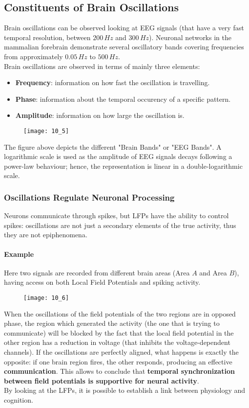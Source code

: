 \subsection{Constituents of Brain Oscillations}
Brain oscillations can be observed looking at EEG signals (that have a very fast temporal
resolution, between \(200\,Hz\) and \(300\,Hz\)). Neuronal networks in the mammalian
forebrain demonstrate several oscillatory bands covering frequencies from approximately
\(0.05\,Hz\) to \(500\,Hz\).\\
Brain oscillations are observed in terms of mainly three elements:
\begin{itemize}
    \item \textbf{Frequency}: information on how fast the oscillation is travelling.
    \item \textbf{Phase}: information about the temporal occurency of a specific pattern.
    \item \textbf{Amplitude}: information on how large the oscillation is.
\end{itemize}
\begin{figure}[H]
    \texttt{[image: 10\_5]}
    \centering
\end{figure}
The figure above depicts the different "Brain Bands" or "EEG Bands". A logarithmic scale is
used as the amplitude of EEG signals decays following a power-law behaviour; hence, the
representation is linear in a double-logarithmic scale.
\subsubsection{Oscillations Regulate Neuronal Processing}
Neurons communicate through spikes, but LFPs have the ability to control spikes: oscillations
are not just a secondary elements of the true activity, thus they are not epiphenomena.
\paragraph{Example}
Here two signals are recorded from different brain areas (Area \(A\) and Area \(B\)), having
access on both Local Field Potentials and spiking activity.
\begin{figure}[H]
    \texttt{[image: 10\_6]}
    \centering
\end{figure}
When the oscillations of the field potentials of the two regions are in opposed phase, the
region which generated the activity (the one that is trying to communicate) will be blocked
by the fact that the local field potential in the other region has a reduction in voltage
(that inhibits the voltage-dependent channels). If the oscillations are perfectly aligned,
what happens is exactly the opposite: if one brain region fires, the other responds,
producing an effective \textbf{communication}. This allows to conclude that
\textbf{temporal synchronization between field potentials is supportive for neural activity}.\\
By looking at the LFPs, it is possible to establish a link between physiology and cognition.
